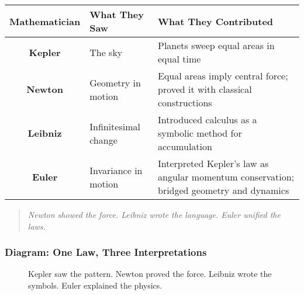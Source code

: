 \begin{center}
\renewcommand{\arraystretch}{1.6}
\begin{tabular}{|c|p{4.5cm}|p{6.5cm}|}
\hline
\textbf{Mathematician} & \textbf{What They Saw} & \textbf{What They Contributed} \\ \hline
\textbf{Kepler} & The sky & Planets sweep equal areas in equal time \\ \hline
\textbf{Newton} & Geometry in motion & Equal areas imply central force; proved it with classical constructions \\ \hline
\textbf{Leibniz} & Infinitesimal change & Introduced calculus as a symbolic method for accumulation \\ \hline
\textbf{Euler} & Invariance in motion & Interpreted Kepler's law as angular momentum conservation; bridged geometry and dynamics \\ \hline
\end{tabular}
\end{center}

\begin{quote}
\textit{Newton showed the force. Leibniz wrote the language. Euler unified the laws.}
\end{quote}

\subsubsection{Diagram: One Law, Three Interpretations}

\begin{figure}[H]
\centering
{}
\caption{Kepler saw the pattern. Newton proved the force. Leibniz wrote the symbols. Euler explained the physics.}
\end{figure}
